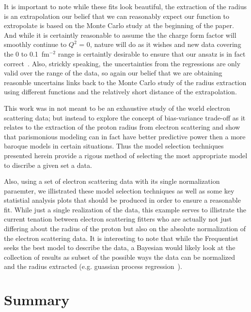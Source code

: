 \documentclass[10pt,aps,prc,twocolumn]{revtex4-1}
\begin{document}
It is important to note while these fits look beautiful, the extraction of the radius is an
extrapolation our belief that we can reasonably expect our function to extropolate is based
on the Monte Carlo study at the beginning of the paper.    And while it is certaintly reasonable
to assume the the charge form factor will smoothly continue to $Q^2$ = 0,
nature will do as it wishes and new data covering the 0 to 0.1~fm$^{-2}$ range is 
certaintly desirable to ensure that our ansatz is in fact correct~\cite{
Gasparian:2014rna,
Peng:2016szv,
Mihovilovic:2016rkr
}.   
Also, strickly speaking, the
uncertainties from the regressions are only valid over the range of the data, so again our 
belief that we are obtaining reasonble uncertains links back to the Monte Carlo study of the
radius extraction using different functions and the relatively short distance of the extrapolation.

This work was in not meant to be an exhaustive study of the world electron scattering data; but 
instead to explore the concept of bias-variance trade-off as it relates to the extraction of the proton 
radius from electron scattering and show that parismonious modeling can in fact have better 
predictive power then a more baroque models in certain situations.   Thus the model selection techniques
presented herein provide a rigous method of selecting the most appropriate model to discribe a given
set a data.

Also, using a set of electron scattering data with its single normalization paraemter, we 
illistrated these model selection techniques as well as 
some key statistial analysis plots that should be produced in order to ensure a reasonable fit.   
While just a single realization of the data, this example serves to illistrate the current tenation 
between electron scattering fitters who are actually not just differing about the radius of the
proton but also on the absolute normalization of the electron scattering data.
It is interesting to note that while the Frequentist
seeks the best model to describe the data, a Bayesian would likely look at the collection of results as  
subset of the possible ways the data can be normalized and the radius extracted (e.g. guassian process 
regression~\cite{Rasmussen:2005}).    


\section{Summary}
\end{document}
